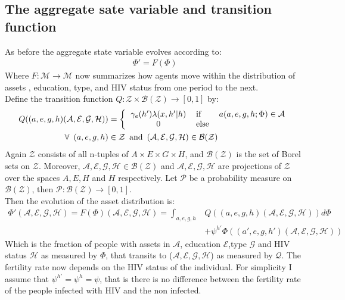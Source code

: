  \subsection*{The aggregate sate variable and transition function}
\noindent As before the aggregate state variable evolves according to:
\begin{align}
\Phi'=F(\Phi)
\end{align} 
Where $F:\mathcal{M}\to\mathcal{M} $ now summarizes how agents move within the distribution of assets , education, type, and HIV status from one period to the next.\\
\noindent Define the transition function $Q:\mathcal{Z}\times\mathcal{B(Z)}\to[0,1]$ by: 
\begin{align*}
Q((a,e,g,h)(\mathcal{A},\mathcal{E},\mathcal{G},\mathcal{H})) &= \left\{
\begin{tabular}{clc}
$\gamma_{e}(h')\lambda(x,h'|h)$ & if      & $a(a,e,g,h;\Phi) \in \mathcal{A} $\\
0 & else & 
\end{tabular}
\right.\\ \label{eq5}
\forall \,\,\,(a,e,g,h)&\in\mathcal{Z}\,\,\,\mbox{and}\,\,\,(\mathcal{A,E,G,H})\in{\mathcal{B(Z)}}
\end{align*}
Again $\mathcal{Z}$ consists of all n-tuples of $A\times E\times G \times H$, and $\mathcal{B(Z)}$ is the set of Borel sets on $\mathcal{Z}$. Moreover, $\mathcal{A,E,G,H}\in\mathcal{B(Z)}$ and $\mathcal{A,E,G,H}$ are projections of $\mathcal{Z}$ over the spaces $A,E,H$ and $H$ respectively. Let $\mathcal{P}$ be a probability measure on $\mathcal{B(Z)}$, then $\mathcal{P}: \mathcal{B(Z)}\to[0,1]$.\\
Then the evolution of the asset distribution is:
\begin{align}
\Phi'(\mathcal{A},\mathcal{E},\mathcal{G,H}) = F(\Phi) (\mathcal{A},\mathcal{E},\mathcal{G,H})= \int_{a,e,g,h}& Q((a,e,g,h)(\mathcal{A},\mathcal{E},\mathcal{G,H})) d \Phi\\
&+\psi^{h'}\Phi((a',e,g,h')(\mathcal{A},\mathcal{E},\mathcal{G,H}))\nonumber
\end{align}
Which is the fraction of people with assets in $\mathcal{A}$, education $\mathcal{E}$,type $\mathcal{G}$ and HIV status $\mathcal{H}$ as measured by $\Phi$, that transits to ($\mathcal{A,E,G,H}$) as measured by $\mathcal{Q}$. The fertility rate now depends on the HIV status of the individual. For simplicity I assume that $\psi^{h'}=\psi^{h}=\psi$, that is there is no difference between the fertility rate of the people infected with HIV and the non infected.\\

